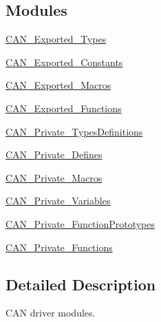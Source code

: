 \subsection*{Modules}
\begin{DoxyCompactItemize}
\item 
\hyperlink{group___c_a_n___exported___types}{C\+A\+N\+\_\+\+Exported\+\_\+\+Types}
\item 
\hyperlink{group___c_a_n___exported___constants}{C\+A\+N\+\_\+\+Exported\+\_\+\+Constants}
\item 
\hyperlink{group___c_a_n___exported___macros}{C\+A\+N\+\_\+\+Exported\+\_\+\+Macros}
\item 
\hyperlink{group___c_a_n___exported___functions}{C\+A\+N\+\_\+\+Exported\+\_\+\+Functions}
\item 
\hyperlink{group___c_a_n___private___types_definitions}{C\+A\+N\+\_\+\+Private\+\_\+\+Types\+Definitions}
\item 
\hyperlink{group___c_a_n___private___defines}{C\+A\+N\+\_\+\+Private\+\_\+\+Defines}
\item 
\hyperlink{group___c_a_n___private___macros}{C\+A\+N\+\_\+\+Private\+\_\+\+Macros}
\item 
\hyperlink{group___c_a_n___private___variables}{C\+A\+N\+\_\+\+Private\+\_\+\+Variables}
\item 
\hyperlink{group___c_a_n___private___function_prototypes}{C\+A\+N\+\_\+\+Private\+\_\+\+Function\+Prototypes}
\item 
\hyperlink{group___c_a_n___private___functions}{C\+A\+N\+\_\+\+Private\+\_\+\+Functions}
\end{DoxyCompactItemize}


\subsection{Detailed Description}
C\+AN driver modules. 

